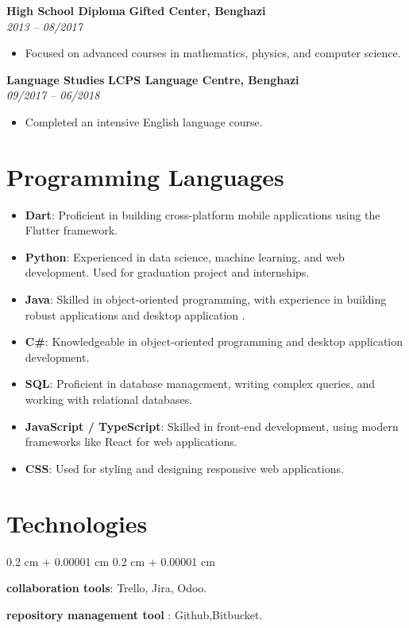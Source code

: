 \documentclass[10pt, letterpaper]{article}
\newenvironment{onecolentry}{
    \begin{adjustwidth}{
        0.2 cm + 0.00001 cm
    }{
        0.2 cm + 0.00001 cm
    }
}{
    \end{adjustwidth}
} %
\begin{document}
\noindent\textbf{High School Diploma} \hfill \textbf{Gifted Center, Benghazi} \\
\textit{2013 – 08/2017} \\
\begin{itemize}
    \item Focused on advanced courses in mathematics, physics, and computer science.
\end{itemize}

\noindent\textbf{Language Studies} \hfill \textbf{LCPS Language Centre, Benghazi} \\
\textit{09/2017 – 06/2018} \\
\begin{itemize}
    \item Completed an intensive English language course.
\end{itemize}



\section*{Programming Languages}
        \vspace{0.2 cm}
\begin{itemize}
    \item \textbf{Dart}: Proficient in building cross-platform mobile applications using the Flutter framework.
    \item \textbf{Python}: Experienced in data science, machine learning, and web development. Used for graduation project and internships.
    \item \textbf{Java}: Skilled in object-oriented programming, with experience in building robust applications and desktop application .
    \item \textbf{C\#}: Knowledgeable in object-oriented programming and desktop application development.
    \item \textbf{SQL}: Proficient in database management, writing complex queries, and working with relational databases.
    \item \textbf{JavaScript / TypeScript}: Skilled in front-end development, using modern frameworks like React for web applications.
    \item \textbf{CSS}: Used for styling and designing responsive web applications.
\end{itemize}
            \vspace{1.5 cm}
    \section{Technologies}

        \vspace{0.2 cm}
        \begin{onecolentry}
 \item \textbf{collaboration tools}: Trello, Jira, Odoo.
  \item \textbf{repository management tool }: Github,Bitbucket.
        \end{onecolentry}


    
\end{document}
